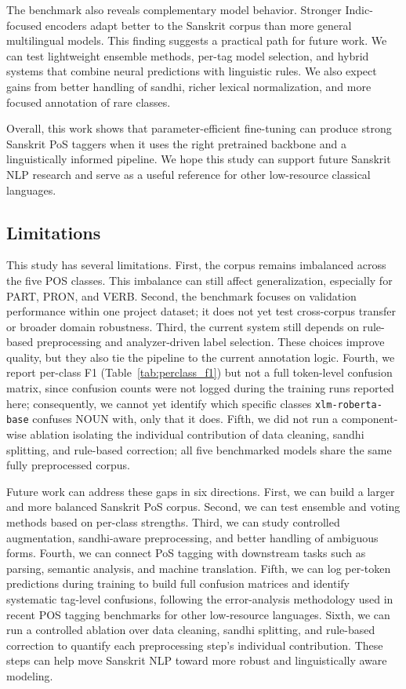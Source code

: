 \documentclass[conference]{IEEEtran}
\begin{document}
The benchmark also reveals complementary model behavior. Stronger Indic-focused encoders adapt better to the Sanskrit corpus than more general multilingual models. This finding suggests a practical path for future work. We can test lightweight ensemble methods, per-tag model selection, and hybrid systems that combine neural predictions with linguistic rules. We also expect gains from better handling of sandhi, richer lexical normalization, and more focused annotation of rare classes.

Overall, this work shows that parameter-efficient fine-tuning can produce strong Sanskrit PoS taggers when it uses the right pretrained backbone and a linguistically informed pipeline. We hope this study can support future Sanskrit NLP research and serve as a useful reference for other low-resource classical languages.

\subsection*{Limitations}
This study has several limitations. First, the corpus remains imbalanced across the five POS classes. This imbalance can still affect generalization, especially for PART, PRON, and VERB. Second, the benchmark focuses on validation performance within one project dataset; it does not yet test cross-corpus transfer or broader domain robustness. Third, the current system still depends on rule-based preprocessing and analyzer-driven label selection. These choices improve quality, but they also tie the pipeline to the current annotation logic. Fourth, we report per-class F1 (Table~\ref{tab:perclass_f1}) but not a full token-level confusion matrix, since confusion counts were not logged during the training runs reported here; consequently, we cannot yet identify which specific classes \texttt{xlm-roberta-base} confuses NOUN with, only that it does. Fifth, we did not run a component-wise ablation isolating the individual contribution of data cleaning, sandhi splitting, and rule-based correction; all five benchmarked models share the same fully preprocessed corpus.

Future work can address these gaps in six directions. First, we can build a larger and more balanced Sanskrit PoS corpus. Second, we can test ensemble and voting methods based on per-class strengths. Third, we can study controlled augmentation, sandhi-aware preprocessing, and better handling of ambiguous forms. Fourth, we can connect PoS tagging with downstream tasks such as parsing, semantic analysis, and machine translation. Fifth, we can log per-token predictions during training to build full confusion matrices and identify systematic tag-level confusions, following the error-analysis methodology used in recent POS tagging benchmarks for other low-resource languages. Sixth, we can run a controlled ablation over data cleaning, sandhi splitting, and rule-based correction to quantify each preprocessing step's individual contribution. These steps can help move Sanskrit NLP toward more robust and linguistically aware modeling.
\end{document}
